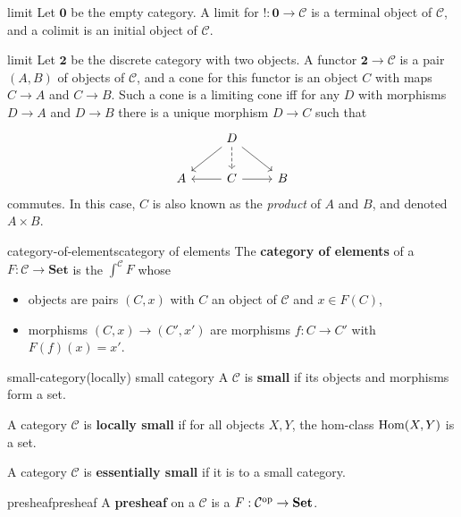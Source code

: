 \begin{example}{limit}
    Let $\textbf{0}$ be the empty category. A limit for $! : \textbf{0} \to \mathcal{C}$ is a terminal object of $\mathcal{C}$, and a colimit is an initial object of $\mathcal{C}$.
\end{example}

\begin{example}{limit}
    Let $\textbf{2}$ be the discrete category with two objects. A functor $\textbf{2} \to \mathcal{C}$ is a pair $(A, B)$ of objects of $\mathcal{C}$, and a cone for this functor is an object $C$ with maps $C \to A$ and $C \to B$. Such a cone is a limiting cone iff for any $D$ with morphisms $D \to A$ and $D \to B$ there is a unique morphism $D \to C$ such that
    \[ \begin{tikzcd} & D \arrow[dashed]{d} \arrow{ld} \arrow{rd} & \\ A & \arrow{l} C \arrow{r} & B \end{tikzcd} \]
    commutes. In this case, $C$ is also known as the \textit{product} of $A$ and $B$, and denoted $A \times B$.
\end{example}

\begin{topic}{category-of-elements}{category of elements}
    The \textbf{category of elements} of a  $F : \mathcal{C} \to \textbf{Set}$ is the  $\int^{\mathcal{C}} F$ whose
    \begin{itemize}
        \item objects are pairs $(C, x)$ with $C$ an object of $\mathcal{C}$ and $x \in F(C)$,
        \item morphisms $(C, x) \to (C', x')$ are morphisms $f : C \to C'$ with $F(f)(x) = x'$.
    \end{itemize}
\end{topic}

\begin{topic}{small-category}{(locally) small category}
    A  $\mathcal{C}$ is \textbf{small} if its objects and morphisms form a set.
    
    A category $\mathcal{C}$ is \textbf{locally small} if for all objects $X, Y$, the hom-class $\operatorname{Hom}(X, Y)$ is a set.
    
    A category $\mathcal{C}$ is \textbf{essentially small} if it is  to a small category.
\end{topic}

\begin{topic}{presheaf}{presheaf}
    A \textbf{presheaf} on a  $\mathcal{C}$ is a  $F : \mathcal{C}^\textup{op} \to \textbf{Set}$.
\end{topic}

